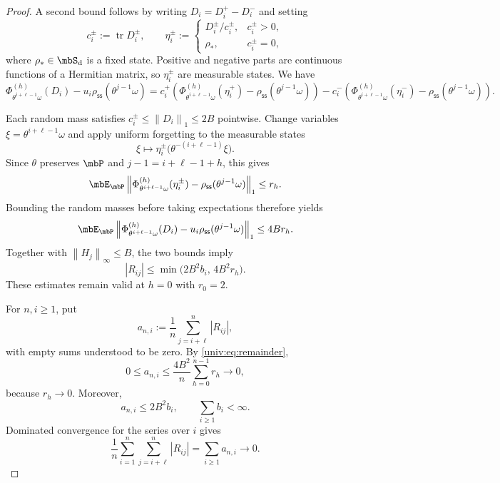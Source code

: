 \documentclass[10pt,a4paper]{amsart}
\numberwithin{equation}{section}   %
\theoremstyle{plain}   %
\theoremstyle{plain}   %
\theoremstyle{examplestyle}
\DeclareMathOperator{\states}{\mbS_d}   %
\DeclareMathOperator{\pr}{\mbP}           %
\newcommand{\s}{\rho_{\mathsf{ss}}}     %
\DeclareMathOperator{\str}{tr} %
\newcommand{\unorm}[1]{\left\lVert#1\right\rVert}
\begin{document}
\begin{proof}
    A second bound follows by writing $D_i=D_i^+-D_i^-$ and setting
    \[
        c_i^\pm:=\str D_i^\pm,
        \qquad
        \eta_i^\pm:=
        \begin{cases}
            D_i^\pm/c_i^\pm, & c_i^\pm>0,\\
            \rho_*, & c_i^\pm=0,
        \end{cases}
    \]
    where $\rho_*\in\states$ is a fixed state.
    Positive and negative parts are continuous functions of a Hermitian matrix, so $\eta_i^\pm$ are measurable states.
    We have
    \[
        \Phi^{(h)}_{\theta^{i+\ell-1}\omega}(D_i)
        -
        u_i\s(\theta^{j-1}\omega)
        =
        c_i^+
        \left(
            \Phi^{(h)}_{\theta^{i+\ell-1}\omega}(\eta_i^+)
            -
            \s(\theta^{j-1}\omega)
        \right)
        -
        c_i^-
        \left(
            \Phi^{(h)}_{\theta^{i+\ell-1}\omega}(\eta_i^-)
            -
            \s(\theta^{j-1}\omega)
        \right).
    \]
    
    Each random mass satisfies $c_i^\pm\le\unorm{D_i}_1\le2B$ pointwise.
    Change variables $\xi=\theta^{i+\ell-1}\omega$ and apply uniform forgetting to the measurable states
    \[
        \xi\longmapsto
        \eta_i^\pm\bigl(\theta^{-(i+\ell-1)}\xi\bigr).
    \]
    Since $\theta$ preserves $\pr$ and $j-1=i+\ell-1+h$, this gives
    \[
        \mbE_{\pr}
        \unorm{
            \Phi^{(h)}_{\theta^{i+\ell-1}\omega}(\eta_i^\pm)
            -
            \s(\theta^{j-1}\omega)
        }_1
        \le r_h.
    \]
    Bounding the random masses before taking expectations therefore yields
    \[
        \mbE_{\pr}
        \unorm{
            \Phi^{(h)}_{\theta^{i+\ell-1}\omega}(D_i)
            -
            u_i\s(\theta^{j-1}\omega)
        }_1
        \le4Br_h.
    \]
    Together with $\unorm{H_j}_\infty\le B$, the two bounds imply
    \begin{equation}
    \label{univ:eq:remainder}
        |R_{ij}|
        \le
        \min\bigl(2B^2b_i,\,4B^2r_h\bigr).
    \end{equation}
    These estimates remain valid at $h=0$ with $r_0=2$.

    For $n,i\ge1$, put
    \[
        a_{n,i}:=\frac1n\sum_{j=i+\ell}^n|R_{ij}|,
    \]
    with empty sums understood to be zero.
    By \eqref{univ:eq:remainder},
    \[
        0\le a_{n,i}
        \le
        \frac{4B^2}{n}\sum_{h=0}^{n-1}r_h
        \longrightarrow0,
    \]
    because $r_h\to0$.
    Moreover,
    \[
        a_{n,i}\le2B^2b_i,
        \qquad
        \sum_{i\ge1}b_i<\infty.
    \]
    Dominated convergence for the series over $i$ gives
    \[
        \frac1n
        \sum_{i=1}^n\sum_{j=i+\ell}^n|R_{ij}|
        =
        \sum_{i\ge1}a_{n,i}
        \longrightarrow0.
    \]


\end{proof}
\end{document}
